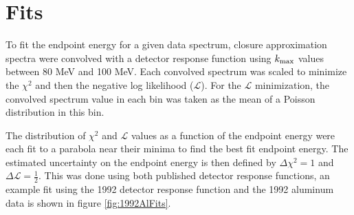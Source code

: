 
\section { Fits }

To fit the endpoint energy for a given data spectrum, closure approximation spectra were convolved with a detector
response function using $\mbox{$k_{\rm max}$}$ values between 80 MeV and 100 MeV.
Each convolved spectrum was scaled to minimize the $\chi^2$ and then the negative log likelihood ($\mathcal{L}$).
For the $\mathcal{L}$ minimization, the convolved spectrum value in each bin was taken as the mean 
of a Poisson distribution in this bin.



The distribution of $\chi^2$ and $\mathcal{L}$ values as a function of the endpoint energy were each fit to a parabola near 
their minima to find the best fit endpoint energy. The estimated uncertainty on the endpoint energy is then
defined by $\Delta \chi^2 = 1$ and $\Delta \mathcal{L} = \frac{1}{2}$. This was done using both published detector response
functions, an example fit using the 1992 detector response function
and the 1992 aluminum data is shown in figure \ref{fig:1992AlFits}. 

